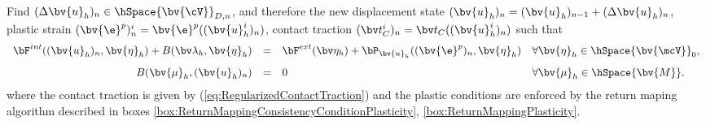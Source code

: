 Find $(\Delta \bv{u}_{h})_{n} \in \hSpace{\bv{\cV}}_{D,n}$, and therefore the new displacement state $(\bv{u}_{h})_{n}=(\bv{u}_{h})_{n-1} + (\Delta \bv{u}_{h})_{n}$, plastic strain $(\bv{\e}^p)^i_{n}=\bv{\e}^p((\bv{u}_{h}^i)_{n})$, contact traction $(\bv t_C^i)_{n} = \bv t_C((\bv{u}_{h}^i)_n)$ such that
\begin{equation} \label{Discr_sadpt_n}
\begin{array}{rcll}
  \bF^{int}((\bv{u}_{h})_n,\bv{\eta}_h) 
+ B(\bv \lambda_h, \bv{\eta}_h) 
&=& \bF^{ext}(\bv\eta_h)
+ \bP_{\bv{u}_{h}} ( (\bv{\e}^p)_n,\bv{\eta}_h) 
&\forall \bv{\eta}_h \in \hSpace{\bv{\mcV}}_0, \\[2ex]
B(\bv{\mu}_h, (\bv{u}_{h})_n) 
&=& 0
&\forall \bv{\mu}_h \in \hSpace{\bv{M}}.
\end{array}
\end{equation}
where the contact traction is given by (\ref{eq:RegularizedContactTraction}) and the plastic conditions are enforced by the return maping algorithm described in boxes \ref{box:ReturnMappingConsistencyConditionPlasticity}, \ref{box:ReturnMappingPlasticity}.

